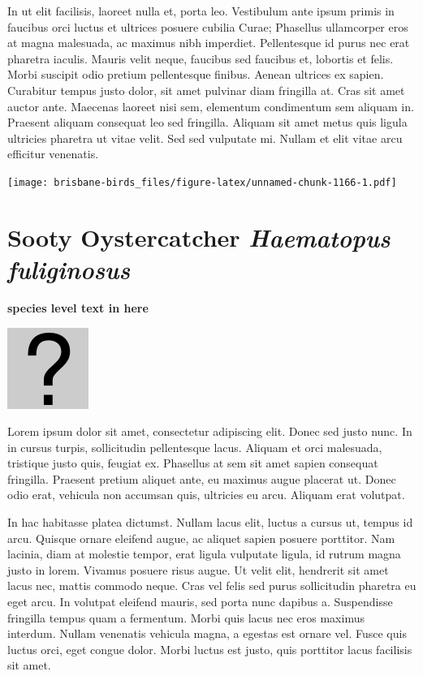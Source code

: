 \documentclass[]{book}
\let\origfigure\figure
\let\endorigfigure\endfigure
\renewenvironment{figure}[1][2] {
  \expandafter\origfigure\expandafter[H]
} {
  \endorigfigure
}
\begin{document}
In ut elit facilisis, laoreet nulla et, porta leo. Vestibulum ante ipsum
primis in faucibus orci luctus et ultrices posuere cubilia Curae;
Phasellus ullamcorper eros at magna malesuada, ac maximus nibh
imperdiet. Pellentesque id purus nec erat pharetra iaculis. Mauris velit
neque, faucibus sed faucibus et, lobortis et felis. Morbi suscipit odio
pretium pellentesque finibus. Aenean ultrices ex sapien. Curabitur
tempus justo dolor, sit amet pulvinar diam fringilla at. Cras sit amet
auctor ante. Maecenas laoreet nisi sem, elementum condimentum sem
aliquam in. Praesent aliquam consequat leo sed fringilla. Aliquam sit
amet metus quis ligula ultricies pharetra ut vitae velit. Sed sed
vulputate mi. Nullam et elit vitae arcu efficitur venenatis.

\begin{figure}
\centering
\texttt{[image: brisbane-birds\_files/figure-latex/unnamed-chunk-1166-1.pdf]}
\caption{\label{fig:unnamed-chunk-1166}insert figure caption}
\end{figure}

\section{\texorpdfstring{Sooty Oystercatcher \emph{Haematopus
fuliginosus}}{Sooty Oystercatcher Haematopus fuliginosus}}\label{sooty-oystercatcher-haematopus-fuliginosus}

\textbf{species level text in here}

\begin{figure}
\centering
\includegraphics{assets/missing.png}
\caption{No image for species}
\end{figure}

Lorem ipsum dolor sit amet, consectetur adipiscing elit. Donec sed justo
nunc. In in cursus turpis, sollicitudin pellentesque lacus. Aliquam et
orci malesuada, tristique justo quis, feugiat ex. Phasellus at sem sit
amet sapien consequat fringilla. Praesent pretium aliquet ante, eu
maximus augue placerat ut. Donec odio erat, vehicula non accumsan quis,
ultricies eu arcu. Aliquam erat volutpat.

In hac habitasse platea dictumst. Nullam lacus elit, luctus a cursus ut,
tempus id arcu. Quisque ornare eleifend augue, ac aliquet sapien posuere
porttitor. Nam lacinia, diam at molestie tempor, erat ligula vulputate
ligula, id rutrum magna justo in lorem. Vivamus posuere risus augue. Ut
velit elit, hendrerit sit amet lacus nec, mattis commodo neque. Cras vel
felis sed purus sollicitudin pharetra eu eget arcu. In volutpat eleifend
mauris, sed porta nunc dapibus a. Suspendisse fringilla tempus quam a
fermentum. Morbi quis lacus nec eros maximus interdum. Nullam venenatis
vehicula magna, a egestas est ornare vel. Fusce quis luctus orci, eget
congue dolor. Morbi luctus est justo, quis porttitor lacus facilisis sit
amet.
\end{document}
